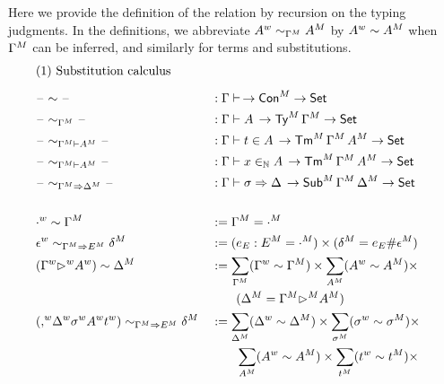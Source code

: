 Here we provide the definition of the relation by recursion on the typing judgments.
In the definitions, we abbreviate ${A}^w \sim_{{\Gamma}^M} {A}^M$ by
${A}^w\sim{A}^M$ when ${\Gamma}^M$ can be inferred, and similarly for
terms and substitutions.
\begin{alignat*}{5}
  & \rlap{(1) Substitution calculus} \\[0.5em]
  & \blank \sim{ \blank} && :  \Gamma \vdash \, \ra \model{\Con} \ra \Set \\
  & \relT{\blank}{\model{\Gamma}}{\blank} && :  \Gamma \vdash A \, \ra \model{\Ty}\,\model{\Gamma} \ra \Set \\
  & \relt{\blank}{\model{\Gamma}}{\model{A}}{\blank} && :  \Gamma \vdash t \in A \, \ra \model{\Tm}\,\model{\Gamma}\,\model{A} \ra \Set \\
  & \relV{\blank}{\model{\Gamma}}{\model{A}}{\blank}&& :  \Gamma \vdash x \invar A \, \ra \model{\Tm}\,\model{\Gamma}\,\model{A} \ra \Set \\
  & \relS{\blank}{\model{\Gamma}}{\model{\Delta}}{ \blank} && :  \Gamma \vdash \sigma \Rightarrow \Delta \, \ra \model{\Sub}\,\model{\Gamma}\,\model{\Delta} \ra \Set \\
  \\
  & \emptyw\sim \model{\Gamma} && := \model{\Gamma}=\model{\cdot} \\
  & \relS{\epsilonw}{\model{\Gamma}}{\model{E}}{\model{\delta}}
  &&
 := (e_E : \model{E} = \model{\cdot})\times (\model{\delta} = e_E \#
 \model{\epsilon})
  \\
  & (\wf{\Gamma}\extw \wf{A})\sim \model{\Delta} &&
   :=
    \sum_{\model{\Gamma}} (\wf{\Gamma}\sim\model{\Gamma}) \times
    \sum_{\model{A}} (\wf{A}\sim\model{A}) \times
    \\
    & && \qquad
    (\model{\Delta} = \model{\Gamma} \model{\ext} \model{A})
    \\
    &
    \relS{(\consw \wf{\Delta}\wf{\sigma}\wf{A}\wf{t})}{\model{\Gamma}}{\model{E}}{\model{\delta}}
    &&
   :=
    \sum_{\model{\Delta}} (\wf{\Delta}\sim\model{\Delta}) \times
    \sum_{\model{\sigma}} (\wf{\sigma}\sim\model{\sigma}) \times
    \\
    & && \qquad
    \sum_{\model{A}} (\wf{A}\sim\model{A}) \times
    \sum_{\model{t}} (\wf{t}\sim\model{t}) \times
    \\

\end{alignat*}
